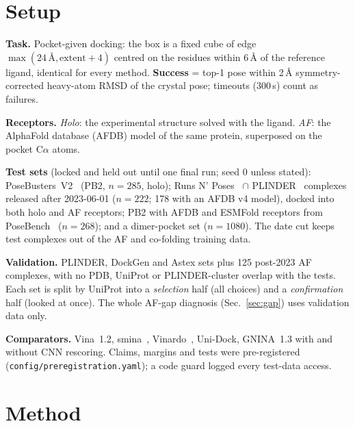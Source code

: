 \documentclass[10pt,a4paper,twocolumn]{article}
\newcommand{\file}[1]{\texttt{\footnotesize #1}}
\begin{document}
\section{Setup}
\label{sec:setup}

\textbf{Task.} Pocket-given docking: the box is a fixed cube of edge $\max(24\,\text{\AA}, \text{extent}+4)$ centred on
the residues within 6\,\AA{} of the reference ligand, identical for every method. \textbf{Success} = top-1 pose within
2\,\AA{} symmetry-corrected heavy-atom RMSD of the crystal pose; timeouts (300\,s) count as failures.

\textbf{Receptors.} \emph{Holo}: the experimental structure solved with the ligand. \emph{AF}: the AlphaFold database
(AFDB) model of the same protein, superposed on the pocket C$\alpha$ atoms.

\textbf{Test sets} (locked and held out until one final run; seed 0 unless stated):
PoseBusters~V2~\cite{buttenschoen2024} (PB2, $n=285$, holo);
Runs N' Poses~\cite{skrinjar2025} $\cap$ PLINDER~\cite{durairaj2024} complexes released after 2023-06-01 ($n=222$; 178
with an AFDB v4 model), docked into both holo and AF receptors;
PB2 with AFDB and ESMFold receptors from PoseBench~\cite{morehead2025} ($n=268$); and a dimer-pocket set ($n=1080$).
The date cut keeps test complexes out of the AF and co-folding training data.

\textbf{Validation.} PLINDER, DockGen and Astex sets plus 125 post-2023 AF complexes, with no PDB, UniProt or PLINDER-cluster
overlap with the tests. Each set is split by UniProt into a \emph{selection} half (all choices) and a
\emph{confirmation} half (looked at once). The whole AF-gap diagnosis (Sec.~\ref{sec:gap}) uses validation data only.

\textbf{Comparators.} Vina~1.2, smina~\cite{koes2013}, Vinardo~\cite{quiroga2016}, Uni-Dock, GNINA~1.3 with and
without CNN rescoring. Claims, margins and tests were pre-registered (\file{config/preregistration.yaml}); a code guard
logged every test-data access.

\section{Method}
\label{sec:method}
\end{document}

